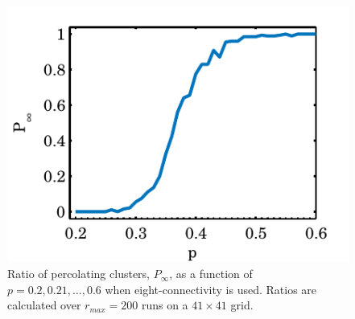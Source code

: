 \begin{figure}
	\centering
	\includegraphics[width=\columnwidth]{./img/assignment_d_p_infinite_ratio_p.pdf}
	\caption{Ratio of percolating clusters, $P_\infty$, as a function of $p = 0.2, 0.21, \dotsc, 0.6$ when eight-connectivity is used. Ratios are calculated over $r_{max} = 200$ runs on a $41 \times 41$ grid.}
	\label{fig:experiment:conn:p_inf_ratio}
\end{figure}



